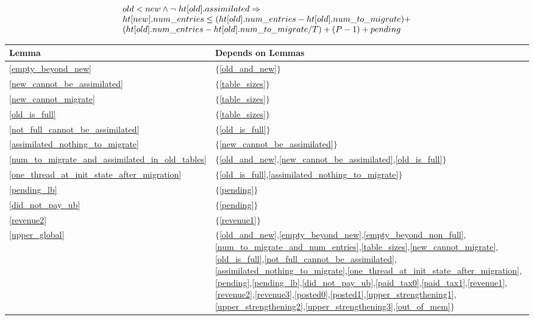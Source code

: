\begin{lemma}
  \begin{equation*}
\begin{array}{l}    
  old < new \wedge \mbox{$\neg\ \mbox{$ht[old]$}.assimilated$} \Rightarrow \\
  \mbox{$ht[new]$}.num\_entries \leq (\mbox{$ht[old]$}.num\_entries - \mbox{$ht[old]$}.num\_to\_migrate) + \\
  (\mbox{$ht[old]$}.num\_entries - \mbox{$ht[old]$}.num\_to\_migrate / T) + (P-1) + pending
\end{array}
\end{equation*}
  \label{upper}
\end{lemma}

\begin{table}[t]
  \begin{center}
    \begin{tabular}{|l|l|}
      \hline
      \textsf{Lemma} & \textsf{Depends on Lemmas} \\
      \hline
      \hline     
      \ref{empty_beyond_new} & $\{$\ref{old_and_new}$\}$ \\
      \ref{new_cannot_be_assimilated}  & $\{$\ref{table_sizes}$\}$ \\
      \ref{new_cannot_migrate}  & $\{$\ref{table_sizes}$\}$ \\
      \ref{old_is_full}  & $\{$\ref{table_sizes}$\}$ \\
      \ref{not_full_cannot_be_assimilated}  & $\{$\ref{old_is_full}$\}$ \\
      \ref{assimilated_nothing_to_migrate}  & $\{$\ref{new_cannot_be_assimilated}$\}$ \\
      \ref{num_to_migrate_and_assimilated_in_old_tables} & $\{$\ref{old_and_new},\ref{new_cannot_be_assimilated},\ref{old_is_full}$\}$ \\
      \ref{one_thread_at_init_state_after_migration} & $\{$\ref{old_is_full},\ref{assimilated_nothing_to_migrate}$\}$ \\
      \ref{pending_lb} & $\{$\ref{pending}$\}$ \\
      \ref{did_not_pay_ub} & $\{$\ref{pending}$\}$ \\
      \ref{revenue2} & $\{$\ref{revenue1}$\}$ \\
      \ref{upper_global} & $\{$\ref{old_and_new},\ref{empty_beyond_new},\ref{empty_beyond_non_full},\ref{num_to_migrate_and_num_entries},\ref{table_sizes},\ref{new_cannot_migrate},\ref{old_is_full},\ref{not_full_cannot_be_assimilated},\ref{assimilated_nothing_to_migrate},\ref{one_thread_at_init_state_after_migration},\ref{pending},\ref{pending_lb},\ref{did_not_pay_ub},\ref{paid_tax0},\ref{paid_tax1},\ref{revenue1},\ref{revenue2},\ref{revenue3},\ref{posted0},\ref{posted1},\ref{upper_strengthening1},\ref{upper_strengthening2},\ref{upper_strengthening3},\ref{out_of_mem}$\}$ \\
      

\end{tabular}
\end{center}
\end{table}
